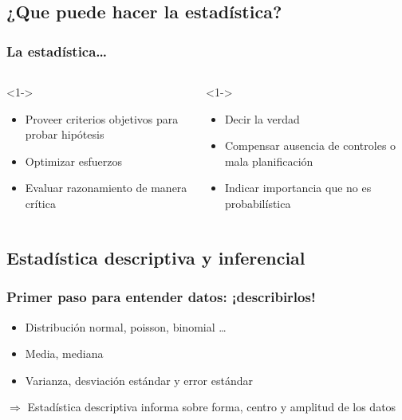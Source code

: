 \documentclass[mathserif]{beamer}
\begin{document}
\subsection[¿Qu\'e puede hacer la esat\'istica?]{¿Que puede hacer la estad\'istica?}

\begin{frame}[label=can-not]
   \frametitle{La estad\'istica\ldots}
   \begin{columns}[t, totalwidth=10cm]
   \begin{column}[]{4.8cm}
     \begin{block}{}<1->
     \begin{itemize}[<1-| uncover@+| handout:1>]
       \item Proveer criterios objetivos para probar hip\'otesis
       \item Optimizar esfuerzos
       \item Evaluar razonamiento de manera cr\'itica
     \end{itemize}
     \end{block}
   \end{column}
   \begin{column}[]{4.8cm}
   \begin{block}{}<1->
     \begin{itemize}[<1-| uncover@+| handout:1>]
       \item Decir la verdad
       \item Compensar ausencia de controles o mala planificaci\'on
       \item Indicar importancia que no es probabil\'istica
     \end{itemize}
   \end{block}
   \end{column}
     \end{columns}
\end{frame}%


\subsection[Descriptiva / inferencial]{Estad\'istica descriptiva y inferencial}

\begin{frame}[label=desc]
\frametitle{Primer paso para entender datos: ¡describirlos!}
 \begin{itemize}
   \item Distribuci\'on normal, poisson, binomial \ldots
   \item Media, mediana
   \item Varianza, desviaci\'on est\'andar y error est\'andar
 \end{itemize}
 \medskip
 \hspace{1em} $\Rightarrow$ Estad\'istica \alert{descriptiva} informa sobre forma, centro y amplitud de los datos
\end{frame}%
\end{document}
